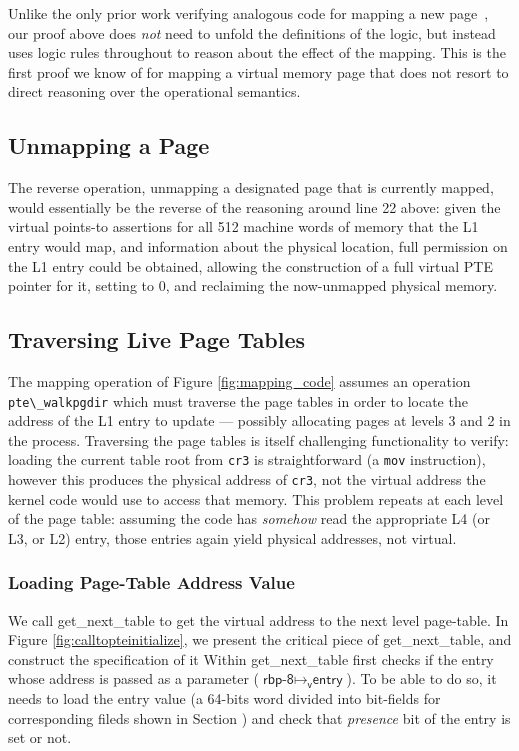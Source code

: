 Unlike the only prior work verifying analogous code for mapping a new page~\cite{kolanski08vstte,kolanski09tphols}, our proof above
does \emph{not} need to unfold the definitions of the logic,
but instead uses logic rules throughout to reason about the effect of the mapping. 
This is the first proof we know of for mapping a virtual memory page that does not resort to direct reasoning over the operational semantics.

\subsection{Unmapping a Page}
The reverse operation, unmapping a designated page that is currently mapped,
would essentially be the reverse of
the reasoning around line 22 above: given the virtual points-to assertions for all 512
machine words of memory that the L1 entry would map,
and information about the physical location, 
full permission on the L1 entry could be obtained, allowing the construction of a
full virtual PTE pointer for it, setting to 0, and reclaiming the now-unmapped physical memory.

\subsection{Traversing Live Page Tables}
\label{sec:traversing}
The mapping operation of Figure \ref{fig:mapping_code} assumes an operation \lstinline|pte\_walkpgdir| which must traverse the page tables
in order to locate the address of the L1 entry to update --- possibly allocating pages at levels 3 and 2 in the process.
Traversing the page tables is itself challenging functionality to verify: loading the current table root from \lstinline|cr3| is straightforward
(a \lstinline|mov| instruction), however this produces the physical address of \lstinline|cr3|, not the virtual address the kernel code would use to access that memory.
This problem repeats at each level of the page table: assuming the code has \emph{somehow} read the appropriate L4 (or L3, or L2) entry, those entries again
yield physical addresses, not virtual.

\subsubsection{Loading Page-Table Address Value}
We call \textsf{get\_next\_table} to get the virtual address to the next level page-table. In Figure \ref{fig:calltopteinitialize}, we present the critical piece of \textsf{get\_next\_table}, and construct the specification of it 
Within \textsf{get\_next\_table} first checks if the entry whose address is passed as a parameter ($\textsf{rbp-8} \mapsto_{\textsf{v}} \textsf{entry}$). To be able to do so, it needs to load the entry value (a 64-bits word divided into bit-fields for corresponding fileds shown in Section {}) and check that \textit{presence} bit of the entry is set or not.

